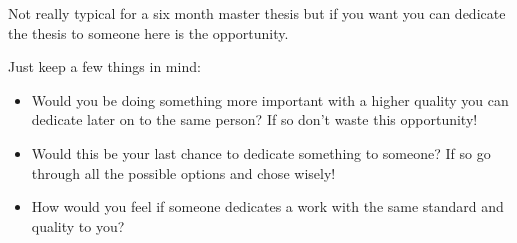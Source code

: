 Not really typical for a six month master thesis but if you want you can dedicate the thesis to someone here is the opportunity. 

Just keep a few things in mind:

\begin{itemize}
    
    \item Would you be doing something more important with a higher quality you can dedicate later on to the same person? If so don't waste this opportunity!
    
    \item Would this be your last chance to dedicate something to someone? If so go through all the possible options and chose wisely!
    
    \item How would you feel if someone dedicates a work with the same standard and quality to you? 
    
\end{itemize}